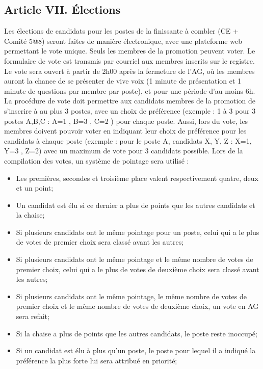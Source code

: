 \subsection*{Article VII. Élections}
Les élections de candidats pour les postes de la finissante à combler (CE + Comité 5@8) seront faites de manière électronique, avec une plateforme web permettant le vote unique. Seuls les membres de la promotion peuvent voter. Le formulaire de vote est transmis par courriel aux membres inscrits sur le registre. Le vote sera ouvert à partir de 2h00 après la fermeture de l’AG, où les membres auront la chance de se présenter de vive voix (1 minute de présentation et 1 minute de questions par membre par poste), et pour une période d'au moins 6h. La procédure de vote doit permettre aux candidats membres de la promotion de s’inscrire à au plus 3 postes, avec un choix de préférence (exemple : 1 à 3 pour 3 postes A,B,C : A=1 , B=3 , C=2 ) pour chaque poste. Aussi, lors du vote, les membres doivent pouvoir voter en indiquant leur choix de préférence pour les candidats à chaque poste (exemple : pour le poste A, candidats X, Y, Z : X=1, Y=3 , Z=2) avec un maximum de vote pour 3 candidats possible. 
Lors de la compilation des votes, un système de pointage sera utilisé :  
\begin{itemize}
\item Les premières, secondes et troisième place valent respectivement quatre, deux et un point;
\item Un candidat est élu si ce dernier a plus de points que les autres candidats et la chaise;
\item Si plusieurs candidats ont le même pointage pour un poste, celui qui a le plus de votes de premier choix sera classé avant les autres;
\item Si plusieurs candidats ont le même pointage et le même nombre de votes de premier choix, celui qui a le plus de votes de deuxième choix sera classé avant les autres;
\item Si plusieurs candidats ont le même pointage, le même nombre de votes de premier choix et le même nombre de votes de deuxième choix, un vote en AG sera refait;
\item Si la chaise a plus de points que les autres candidats, le poste reste inoccupé;
\item Si un candidat est élu à plus qu'un poste, le poste pour lequel il a indiqué la préférence la plus forte lui sera attribué en priorité;
\end{itemize}

